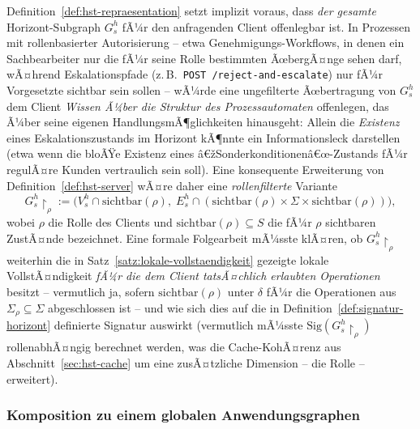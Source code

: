 ﻿\documentclass[a4paper,12pt]{article}
\theoremstyle{definition}
\begin{document}
Definition~\ref{def:hst-repraesentation} setzt implizit voraus, dass \emph{der gesamte}
Horizont-Subgraph $G_s^h$ fÃ¼r den anfragenden Client offenlegbar ist. In Prozessen mit
rollenbasierter Autorisierung -- etwa Genehmigungs-Workflows, in denen ein
Sachbearbeiter nur die fÃ¼r seine Rolle bestimmten ÃœbergÃ¤nge sehen darf, wÃ¤hrend
Eskalationspfade (z.\,B.\ \texttt{POST /reject-and-escalate}) nur fÃ¼r Vorgesetzte
sichtbar sein sollen -- wÃ¼rde eine ungefilterte Ãœbertragung von $G_s^h$ dem Client
\emph{Wissen Ã¼ber die Struktur des Prozessautomaten} offenlegen, das Ã¼ber seine eigenen
HandlungsmÃ¶glichkeiten hinausgeht: Allein die \emph{Existenz} eines
Eskalationszustands im Horizont kÃ¶nnte ein Informationsleck darstellen (etwa wenn die
bloÃŸe Existenz eines â€žSonderkonditionenâ€œ-Zustands fÃ¼r regulÃ¤re Kunden vertraulich sein
soll). Eine konsequente Erweiterung von Definition~\ref{def:hst-server} wÃ¤re daher eine
\emph{rollenfilterte} Variante
\[
	G_s^h\!\restriction_\rho := \bigl(V_s^h\cap\mathrm{sichtbar}(\rho),\;
	E_s^h\cap(\mathrm{sichtbar}(\rho)\times\Sigma\times\mathrm{sichtbar}(\rho))\bigr),
\]
wobei $\rho$ die Rolle des Clients und $\mathrm{sichtbar}(\rho)\subseteq S$ die fÃ¼r $\rho$
sichtbaren ZustÃ¤nde bezeichnet. Eine formale Folgearbeit mÃ¼sste klÃ¤ren, ob
$G_s^h\!\restriction_\rho$ weiterhin die in Satz~\ref{satz:lokale-vollstaendigkeit}
gezeigte lokale VollstÃ¤ndigkeit \emph{fÃ¼r die dem Client tatsÃ¤chlich erlaubten
Operationen} besitzt -- vermutlich ja, sofern $\mathrm{sichtbar}(\rho)$ unter $\delta$
fÃ¼r die Operationen aus $\Sigma_\rho\subseteq\Sigma$ abgeschlossen ist -- und wie sich
dies auf die in Definition~\ref{def:signatur-horizont} definierte Signatur auswirkt
(vermutlich mÃ¼sste $\mathrm{Sig}(G_s^h\!\restriction_\rho)$ rollenabhÃ¤ngig berechnet
werden, was die Cache-KohÃ¤renz aus Abschnitt~\ref{sec:hst-cache} um eine zusÃ¤tzliche
Dimension -- die Rolle -- erweitert).

\subsubsection{Komposition zu einem globalen Anwendungsgraphen}
\end{document}
